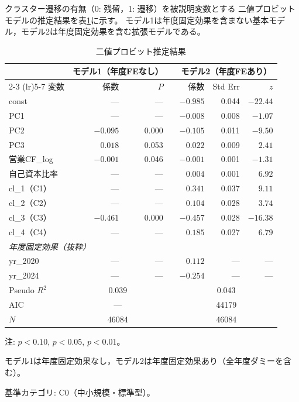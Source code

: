 クラスター遷移の有無（0: 残留，1: 遷移）を被説明変数とする
二値プロビットモデルの推定結果を表\ref{tab:probit}に示す。
モデル1は年度固定効果を含まない基本モデル，モデル2は年度固定効果を含む拡張モデルである。

\begin{table}[htbp]
  \centering
  \caption{二値プロビット推定結果}
  \label{tab:probit}
  \small
  \begin{tabular}{lrrrrrr}
    \toprule
    & \multicolumn{2}{c}{モデル1（年度FEなし）} & & \multicolumn{3}{c}{モデル2（年度FEあり）} \\
    \cmidrule(lr){2-3} \cmidrule(lr){5-7}
    変数 & 係数 & $P$ & & 係数 & Std Err & $z$ \\
    \midrule
    const        & ---    & ---   & & $-0.985$           & 0.044 & $-22.44$ \\
    PC1          & ---    & ---   & & $-0.008$           & 0.008 & $-1.07$ \\
    PC2          & $-0.095$\sig{***} & 0.000 & & $-0.105$\sig{***} & 0.011 & $-9.50$ \\
    PC3          & $0.018$           & 0.053 & & $0.022$\sig{*}     & 0.009 & $2.41$ \\
    営業CF\_log  & $-0.001$\sig{*}   & 0.046 & & $-0.001$           & 0.001 & $-1.31$ \\
    自己資本比率 & ---    & ---   & & $0.004$\sig{***}   & 0.001 & $6.92$ \\
    cl\_1（C1）  & ---    & ---   & & $0.341$\sig{***}   & 0.037 & $9.11$ \\
    cl\_2（C2）  & ---    & ---   & & $0.104$\sig{**}    & 0.028 & $3.74$ \\
    cl\_3（C3）  & $-0.461$\sig{***} & 0.000 & & $-0.457$\sig{***} & 0.028 & $-16.38$ \\
    cl\_4（C4）  & ---    & ---   & & $0.185$\sig{***}   & 0.027 & $6.79$ \\
    \midrule
    \multicolumn{7}{l}{\textit{年度固定効果（抜粋）}} \\
    yr\_2020     & ---    & ---   & & $0.112$\sig{**}    & ---   & --- \\
    yr\_2024     & ---    & ---   & & $-0.254$\sig{***}  & ---   & --- \\
    \midrule
    Pseudo $R^2$ & \multicolumn{2}{c}{0.039} & & \multicolumn{3}{c}{0.043} \\
    AIC          & \multicolumn{2}{c}{---}    & & \multicolumn{3}{c}{\num{44179}} \\
    $N$          & \multicolumn{2}{c}{\num{46084}} & & \multicolumn{3}{c}{\num{46084}} \\
    \bottomrule
  \end{tabular}
  \begin{tablenotes}
    \small
    \item 注: \sig{*}$p<0.10$, \sig{**}$p<0.05$, \sig{***}$p<0.01$。
    \item モデル1は年度固定効果なし，モデル2は年度固定効果あり（全年度ダミーを含む）。
    \item 基準カテゴリ: C0（中小規模・標準型）。
  \end{tablenotes}
\end{table}


